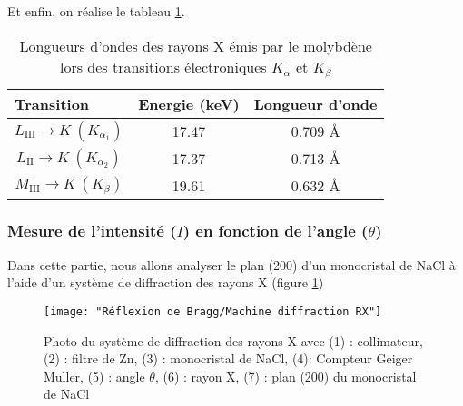 \newpage
Et enfin, on réalise le tableau \ref{tab: Transition nergitique en les diffrentes couche du molybdne et les diffrentes longueurs donde misse par les transitions}. 
\begin{table}[h!]
	\centering
	\begin{tabular}{|c|c|c|}
		\hline
		\multicolumn{1}{|l|}{\textbf{Transition}} & \multicolumn{1}{l|}{\textbf{Energie (keV)}} & \multicolumn{1}{l|}{\textbf{Longueur d'onde}} \\ \hline
		$L_{\mathrm{III}} \to K \ (K_{\alpha_1}) $                    & 17.47                                       & 0.709 \AA                                       \\ \hline
		$L_{\mathrm{II}} \to K \ (K_{\alpha_2}) $                      & 17.37                                       & 0.713 \AA                                       \\ \hline
		$M_{\mathrm{III}} \to K \ (K_{\beta}) $                         & 19.61                                       & 0.632 \AA                                       \\ \hline
	\end{tabular}
	\caption{\centering Longueurs d'ondes des rayons X émis par le molybdène lors des transitions électroniques $K_{\alpha}$ et $K_{\beta}$}
	\label{tab: Transition nergitique en les diffrentes couche du molybdne et les diffrentes longueurs donde misse par les transitions}
\end{table}





\subsubsection{Mesure de l’intensité ($I$) en fonction de l’angle ($\theta$)}
Dans cette partie, nous allons analyser le plan (200) d'un monocristal de NaCl à l'aide d'un système de diffraction des rayons X (figure \ref{fig:machine-diffraction-rx})

\begin{figure}[h!]
	\centering
	\texttt{[image: "Réflexion de Bragg/Machine diffraction RX"]}
	\caption{\centering Photo du système de diffraction des rayons X avec (1) : collimateur, (2) : filtre de Zn, (3) : monocristal de NaCl, (4): Compteur Geiger Muller, (5) : angle $\theta$, (6) : rayon X, (7) : plan (200) du monocristal de NaCl }
	\label{fig:machine-diffraction-rx}
\end{figure}



